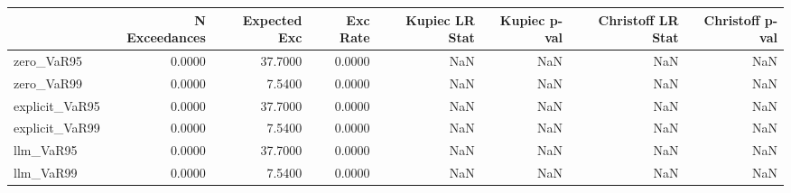 \begin{tabular}{lrrrrrrr}
\toprule
 & N Exceedances & Expected Exc & Exc Rate & Kupiec LR Stat & Kupiec p-val & Christoff LR Stat & Christoff p-val \\
\midrule
zero_VaR95 & 0.0000 & 37.7000 & 0.0000 & NaN & NaN & NaN & NaN \\
zero_VaR99 & 0.0000 & 7.5400 & 0.0000 & NaN & NaN & NaN & NaN \\
explicit_VaR95 & 0.0000 & 37.7000 & 0.0000 & NaN & NaN & NaN & NaN \\
explicit_VaR99 & 0.0000 & 7.5400 & 0.0000 & NaN & NaN & NaN & NaN \\
llm_VaR95 & 0.0000 & 37.7000 & 0.0000 & NaN & NaN & NaN & NaN \\
llm_VaR99 & 0.0000 & 7.5400 & 0.0000 & NaN & NaN & NaN & NaN \\
\bottomrule
\end{tabular}
